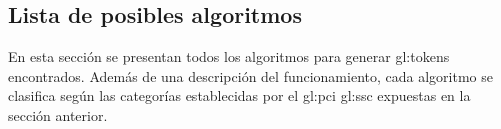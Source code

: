 %
%

\subsection{Lista de posibles algoritmos}

En esta sección se presentan todos los algoritmos para generar
\glspl{gl:token} encontrados. Además de una descripción del funcionamiento,
cada algoritmo se clasifica según las categorías establecidas por el
\gls{gl:pci} \gls{gl:ssc} expuestas en la sección anterior.



